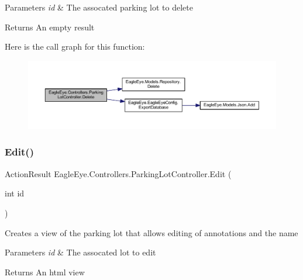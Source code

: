 \begin{DoxyParams}{Parameters}
{\em id} & The assocated parking lot to delete\\
\hline
\end{DoxyParams}
\begin{DoxyReturn}{Returns}
An empty result
\end{DoxyReturn}
Here is the call graph for this function\+:
\nopagebreak
\begin{figure}[H]
\begin{center}
\leavevmode
\includegraphics[width=350pt]{class_eagle_eye_1_1_controllers_1_1_parking_lot_controller_aa26300d7c8f2fa2e41c15ceb0eb5c79e_cgraph}
\end{center}
\end{figure}
\mbox{\label{class_eagle_eye_1_1_controllers_1_1_parking_lot_controller_a4c61e3d4b7e032a616e0624bf79fbba8}} 
\subsubsection{\texorpdfstring{Edit()}{Edit()}}
{\footnotesize\ttfamily Action\+Result Eagle\+Eye.\+Controllers.\+Parking\+Lot\+Controller.\+Edit (\begin{DoxyParamCaption}\item[{int}]{id }\end{DoxyParamCaption})}



Creates a view of the parking lot that allows editing of annotations and the name 


\begin{DoxyParams}{Parameters}
{\em id} & The assocated lot to edit\\
\hline
\end{DoxyParams}
\begin{DoxyReturn}{Returns}
An html view
\end{DoxyReturn}
\mbox{\label{class_eagle_eye_1_1_controllers_1_1_parking_lot_controller_ab3bd9c4d1c40c73a214475198aa74039}} 
